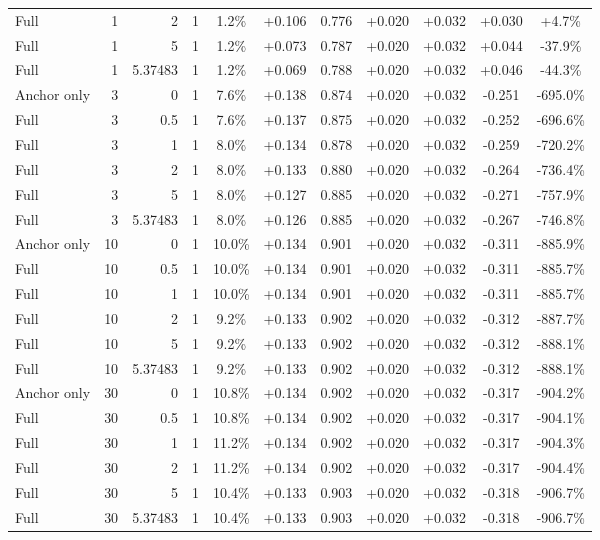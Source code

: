 \begin{table}[htbp]
\begin{tabular}{lrrrccccccc}
Full & 1 & 2 & 1 & 1.2\% & +0.106 & 0.776 & +0.020 & +0.032 & +0.030 & +4.7\% \\
Full & 1 & 5 & 1 & 1.2\% & +0.073 & 0.787 & +0.020 & +0.032 & +0.044 & -37.9\% \\
Full & 1 & 5.37483 & 1 & 1.2\% & +0.069 & 0.788 & +0.020 & +0.032 & +0.046 & -44.3\% \\
Anchor only & 3 & 0 & 1 & 7.6\% & +0.138 & 0.874 & +0.020 & +0.032 & -0.251 & -695.0\% \\
Full & 3 & 0.5 & 1 & 7.6\% & +0.137 & 0.875 & +0.020 & +0.032 & -0.252 & -696.6\% \\
Full & 3 & 1 & 1 & 8.0\% & +0.134 & 0.878 & +0.020 & +0.032 & -0.259 & -720.2\% \\
Full & 3 & 2 & 1 & 8.0\% & +0.133 & 0.880 & +0.020 & +0.032 & -0.264 & -736.4\% \\
Full & 3 & 5 & 1 & 8.0\% & +0.127 & 0.885 & +0.020 & +0.032 & -0.271 & -757.9\% \\
Full & 3 & 5.37483 & 1 & 8.0\% & +0.126 & 0.885 & +0.020 & +0.032 & -0.267 & -746.8\% \\
Anchor only & 10 & 0 & 1 & 10.0\% & +0.134 & 0.901 & +0.020 & +0.032 & -0.311 & -885.9\% \\
Full & 10 & 0.5 & 1 & 10.0\% & +0.134 & 0.901 & +0.020 & +0.032 & -0.311 & -885.7\% \\
Full & 10 & 1 & 1 & 10.0\% & +0.134 & 0.901 & +0.020 & +0.032 & -0.311 & -885.7\% \\
Full & 10 & 2 & 1 & 9.2\% & +0.133 & 0.902 & +0.020 & +0.032 & -0.312 & -887.7\% \\
Full & 10 & 5 & 1 & 9.2\% & +0.133 & 0.902 & +0.020 & +0.032 & -0.312 & -888.1\% \\
Full & 10 & 5.37483 & 1 & 9.2\% & +0.133 & 0.902 & +0.020 & +0.032 & -0.312 & -888.1\% \\
Anchor only & 30 & 0 & 1 & 10.8\% & +0.134 & 0.902 & +0.020 & +0.032 & -0.317 & -904.2\% \\
Full & 30 & 0.5 & 1 & 10.8\% & +0.134 & 0.902 & +0.020 & +0.032 & -0.317 & -904.1\% \\
Full & 30 & 1 & 1 & 11.2\% & +0.134 & 0.902 & +0.020 & +0.032 & -0.317 & -904.3\% \\
Full & 30 & 2 & 1 & 11.2\% & +0.134 & 0.902 & +0.020 & +0.032 & -0.317 & -904.4\% \\
Full & 30 & 5 & 1 & 10.4\% & +0.133 & 0.903 & +0.020 & +0.032 & -0.318 & -906.7\% \\
Full & 30 & 5.37483 & 1 & 10.4\% & +0.133 & 0.903 & +0.020 & +0.032 & -0.318 & -906.7\% \\

\end{tabular}
\end{table}

